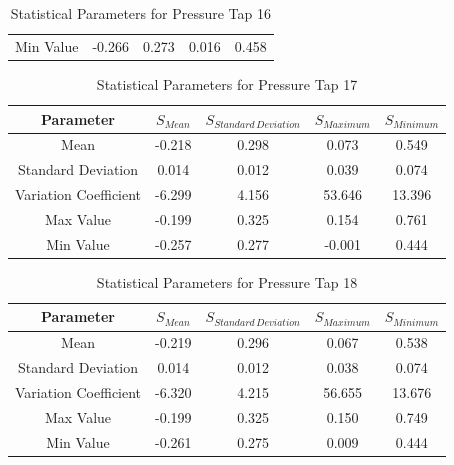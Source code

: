 \documentclass[11pt,a4paper,titlepage]{report}
\begin{document}
\begin{appendix}
\begin{table}[h]
\begin{tabular}{c|c|c|c|c}
Min Value             & -0.266 & 0.273 & 0.016  & 0.458 
    \end{tabular}
    \caption{Statistical Parameters for Pressure Tap 16}
    \label{tab:wind statistical parameters 16}
\end{table}
\begin{table}[h]
    \centering
    \begin{tabular}{c|c|c|c|c}
    Parameter & $S_{Mean}$ & $S_{Standard\,Deviation}$ & $S_{Maximum}$ &	$S_{Minimum}$ \\
    \hline
Mean                  & -0.218 & 0.298 & 0.073  & 0.549  \\
Standard Deviation    & 0.014  & 0.012 & 0.039  & 0.074  \\
Variation Coefficient & -6.299 & 4.156 & 53.646 & 13.396 \\
Max Value             & -0.199 & 0.325 & 0.154  & 0.761  \\
Min Value             & -0.257 & 0.277 & -0.001 & 0.444 
    \end{tabular}
    \caption{Statistical Parameters for Pressure Tap 17}
    \label{tab:wind statistical parameters 17}
\end{table}
\begin{table}[h]
    \centering
    \begin{tabular}{c|c|c|c|c}
    Parameter & $S_{Mean}$ & $S_{Standard\,Deviation}$ & $S_{Maximum}$ &	$S_{Minimum}$ \\
    \hline
Mean                  & -0.219 & 0.296 & 0.067  & 0.538  \\
Standard Deviation    & 0.014  & 0.012 & 0.038  & 0.074  \\
Variation Coefficient & -6.320 & 4.215 & 56.655 & 13.676 \\
Max Value             & -0.199 & 0.325 & 0.150  & 0.749  \\
Min Value             & -0.261 & 0.275 & 0.009  & 0.444 
    \end{tabular}
    \caption{Statistical Parameters for Pressure Tap 18}
    \label{tab:wind statistical parameters 18}
\end{table}
\end{appendix}
 
\end{document}
